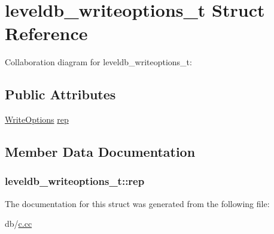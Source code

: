 \hypertarget{structleveldb__writeoptions__t}{\section{leveldb\-\_\-writeoptions\-\_\-t Struct Reference}
\label{structleveldb__writeoptions__t}
}


Collaboration diagram for leveldb\-\_\-writeoptions\-\_\-t\-:
\subsection*{Public Attributes}
\begin{DoxyCompactItemize}
\item 
\hyperlink{structleveldb_1_1_write_options}{Write\-Options} \hyperlink{structleveldb__writeoptions__t_ad51ccdc92007bd69dcb075bba4aef788}{rep}
\end{DoxyCompactItemize}


\subsection{Member Data Documentation}
\hypertarget{structleveldb__writeoptions__t_ad51ccdc92007bd69dcb075bba4aef788}{
\subsubsection[{rep}]{ leveldb\-\_\-writeoptions\-\_\-t\-::rep}}\label{structleveldb__writeoptions__t_ad51ccdc92007bd69dcb075bba4aef788}


The documentation for this struct was generated from the following file\-:\begin{DoxyCompactItemize}
\item 
db/\hyperlink{c_8cc}{c.\-cc}\end{DoxyCompactItemize}
